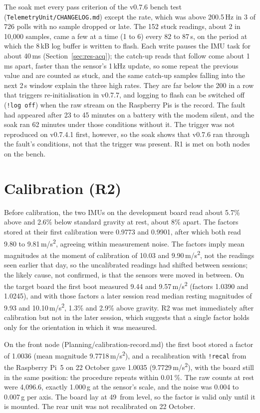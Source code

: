 The soak met every pass criterion of the v0.7.6 bench test (\texttt{TelemetryUnit/\allowbreak{}CHANGELOG.md}) except the rate, which was above 200.5\,Hz in 3 of 726 polls with no sample dropped or late. The 152 stuck readings, about 2 in 10,000 samples, came a few at a time (1 to 6) every 82 to 87\,s, on the period at which the 8\,kB log buffer is written to flash. Each write pauses the IMU task for about 40\,ms (Section~\ref{sec:res-acq}); the catch-up reads that follow come about 1\,ms apart, faster than the sensor's 1\,kHz update, so some repeat the previous value and are counted as stuck, and the same catch-up samples falling into the next 2\,s window explain the three high rates. They are far below the 200 in a row that triggers re-initialisation in v0.7.7, and logging to flash can be switched off (\texttt{!log off}) when the raw stream on the Raspberry Pis is the record. The fault had appeared after 23 to 45 minutes on a battery with the modem silent, and the soak ran 62 minutes under those conditions without it. The trigger was not reproduced on v0.7.4.1 first, however, so the soak shows that v0.7.6 ran through the fault's conditions, not that the trigger was present. R1 is met on both nodes on the bench.

\section{Calibration (R2)}
\label{sec:resx-cal}

Before calibration, the two IMUs on the development board read about 5.7\% above and 2.6\% below standard gravity at rest, about 8\% apart. The factors stored at their first calibration were 0.9773 and 0.9901, after which both read 9.80 to 9.81\,m/s\textsuperscript{2}, agreeing within measurement noise. The factors imply mean magnitudes at the moment of calibration of 10.03 and 9.90\,m/s\textsuperscript{2}, not the readings seen earlier that day, so the uncalibrated readings had shifted between sessions; the likely cause, not confirmed, is that the sensors were moved in between. On the target board the first boot measured 9.44 and 9.57\,m/s\textsuperscript{2} (factors 1.0390 and 1.0245), and with those factors a later session read median resting magnitudes of 9.93 and 10.10\,m/s\textsuperscript{2}, 1.3\% and 2.9\% above gravity. R2 was met immediately after calibration but not in the later session, which suggests that a single factor holds only for the orientation in which it was measured.

On the front node (Planning/calibration-record.md) the first boot stored a factor of 1.0036 (mean magnitude 9.7718\,m/s\textsuperscript{2}), and a recalibration with \texttt{!recal} from the Raspberry Pi~5 on 22 October gave 1.0035 (9.7729\,m/s\textsuperscript{2}), with the board still in the same position: the procedure repeats within 0.01\,\%. The raw counts at rest were 4,096.6, exactly 1.000\,g at the sensor's scale, and the noise was 0.004 to 0.007\,g per axis. The board lay at 49\textdegree\ from level, so the factor is valid only until it is mounted. The rear unit was not recalibrated on 22 October.

